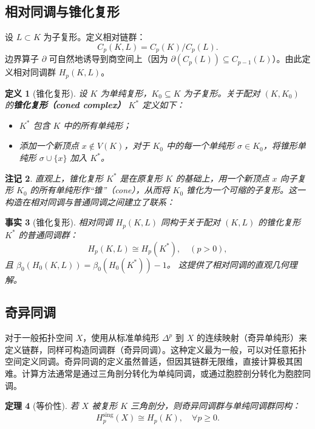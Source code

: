 \documentclass[UTF8]{ctexart}
\newtheorem{definition}{定义}[section]
\newtheorem{remark}[definition]{注记}
\newtheorem{fact}[definition]{事实}
\newtheorem{theorem}[definition]{定理}
\begin{document}
\subsection{相对同调与锥化复形}
\label{subsec:relative-homology}

设 \(L \subset K\) 为子复形。定义相对链群：
\[
C_p(K, L) = C_p(K) / C_p(L).
\]
边界算子 \(\partial\) 可自然地诱导到商空间上（因为 \(\partial(C_p(L)) \subseteq C_{p-1}(L)\)）。由此定义相对同调群 \(H_p(K, L)\)。

\begin{definition}[锥化复形]
\label{def:coned-complex}
设 \(K\) 为单纯复形，\(K_0 \subseteq K\) 为子复形。关于配对 \((K, K_0)\) 的\textbf{锥化复形（coned complex）} \(K^*\) 定义如下：
\begin{itemize}
    \item \(K^*\) 包含 \(K\) 中的所有单纯形；
    \item 添加一个新顶点 \(x \notin V(K)\)，对于 \(K_0\) 中的每一个单纯形 \(\sigma \in K_0\)，将锥形单纯形 \(\sigma \cup \{x\}\) 加入 \(K^*\)。
\end{itemize}
\end{definition}

\begin{remark}
直观上，锥化复形 \(K^*\) 是在原复形 \(K\) 的基础上，用一个新顶点 \(x\) 向子复形 \(K_0\) 的所有单纯形作“锥”（cone），从而将 \(K_0\) 锥化为一个可缩的子复形。这一构造在相对同调与普通同调之间建立了联系：
\end{remark}

\begin{fact}[锥化复形]
\label{fact:coned-complex}
相对同调 \(H_p(K, L)\) 同构于关于配对 \((K, L)\) 的锥化复形 \(K^*\) 的普通同调群：
\[
H_p(K, L) \cong H_p(K^*), \quad (p>0),
\]
且 \(\beta_0(H_0(K, L)) = \beta_0(H_0(K^*)) - 1\)。
这提供了相对同调的直观几何理解。
\end{fact}

\subsection{奇异同调}
\label{subsec:singular-homology}

对于一般拓扑空间 \(X\)，使用从标准单纯形 \(\Delta^p\) 到 \(X\) 的连续映射（奇异单纯形）来定义链群，同样可构造同调群（奇异同调）。这种定义最为一般，可以对任意拓扑空间定义同调。奇异同调的定义虽然普适，但因其链群无限维，直接计算极其困难。计算方法通常是通过三角剖分转化为单纯同调，或通过胞腔剖分转化为胞腔同调。

\begin{theorem}[等价性]
\label{thm:singular-simplicial-equivalence}
若 \(X\) 被复形 \(K\) 三角剖分，则奇异同调群与单纯同调群同构：
\[
H_p^{\text{sing}}(X) \cong H_p(K), \quad \forall p \ge 0.
\]
\end{theorem}
\end{document}
